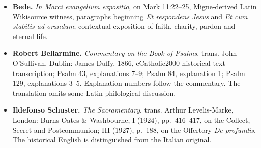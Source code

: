 \begin{itemize}
\item \textbf{Bede.} \textit{In Marci evangelium expositio}, on Mark 11:22--25, Migne-derived Latin Wikisource witness, paragraphs beginning \textit{Et respondens Jesus} and \textit{Et cum stabitis ad orandum}; contextual exposition of faith, charity, pardon and eternal life.

\item \textbf{Robert Bellarmine.} \textit{Commentary on the Book of Psalms}, trans. John O'Sullivan, Dublin: James Duffy, 1866, eCatholic2000 historical-text transcription; Psalm 43, explanations 7--9; Psalm 84, explanation 1; Psalm 129, explanations 3--5. Explanation numbers follow the commentary. The translation omits some Latin philological discussion.

\item \textbf{Ildefonso Schuster.} \textit{The Sacramentary}, trans. Arthur Levelis-Marke, London: Burns Oates \& Washbourne, I (1924), pp.~416--417, on the Collect, Secret and Postcommunion; III (1927), p.~188, on the Offertory \textit{De profundis}. The historical English is distinguished from the Italian original.
\end{itemize}
